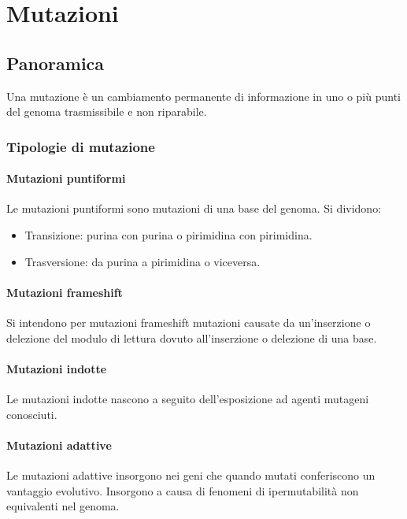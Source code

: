 \chapter{Mutazioni}

\section{Panoramica}
Una mutazione \`e un cambiamento permanente di informazione in uno o pi\`u punti del genoma trasmissibile e non riparabile.

	\subsection{Tipologie di mutazione}

		\subsubsection{Mutazioni puntiformi}
		Le mutazioni puntiformi sono mutazioni di una base del genoma.
		Si dividono:
		\begin{multicols}{2}
			\begin{itemize}
				\item Transizione: purina con purina o pirimidina con pirimidina.
				\item Trasversione: da purina a pirimidina o viceversa.
			\end{itemize}
		\end{multicols}

		\subsubsection{Mutazioni frameshift}
		Si intendono per mutazioni frameshift mutazioni causate da un'inserzione o delezione del modulo di lettura dovuto all'inserzione o delezione di una base.

		\subsubsection{Mutazioni indotte}
		Le mutazioni indotte nascono a seguito dell'esposizione ad agenti mutageni conosciuti.

		\subsubsection{Mutazioni adattive}
		Le mutazioni adattive insorgono nei geni che quando mutati conferiscono un vantaggio evolutivo.
		Insorgono a causa di fenomeni di ipermutabilit\`a non equivalenti nel genoma.

